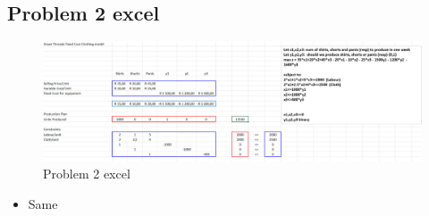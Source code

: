 \documentclass[12pt, a4paper]{article}
\begin{document}
\subsection*{Problem 2 excel}
\begin{figure}[ht]
    \centering
    \includegraphics*[width=1.2\textwidth]{Problem_2_excel.png}
    \caption{Problem 2 excel}
    \label{fig: Problem 2 excel}
\end{figure}
\begin{itemize}
    \item Same
\end{itemize}
\end{document}

